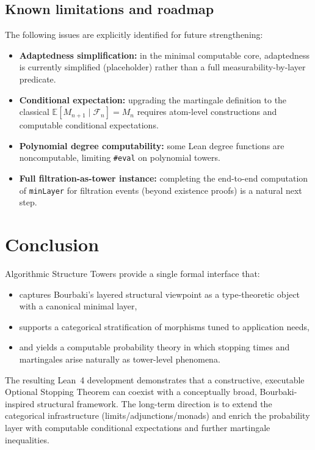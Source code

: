 \documentclass[11pt]{article}
\newcommand{\EE}{\mathbb{E}}
\begin{document}
\subsection{Known limitations and roadmap}
The following issues are explicitly identified for future strengthening:
\begin{itemize}[leftmargin=1.2em]
\item \textbf{Adaptedness simplification:} in the minimal computable core, adaptedness is currently simplified (placeholder) rather than a full measurability-by-layer predicate.
\item \textbf{Conditional expectation:} upgrading the martingale definition to the classical $\EE[M_{n+1}\mid \mathcal{F}_n]=M_n$ requires atom-level constructions and computable conditional expectations.
\item \textbf{Polynomial degree computability:} some Lean degree functions are noncomputable, limiting \texttt{\#eval} on polynomial towers.
\item \textbf{Full filtration-as-tower instance:} completing the end-to-end computation of \texttt{minLayer} for filtration events (beyond existence proofs) is a natural next step.
\end{itemize}

\section{Conclusion}
Algorithmic Structure Towers provide a single formal interface that:
\begin{itemize}[leftmargin=1.2em]
\item captures Bourbaki's layered structural viewpoint as a type-theoretic object with a canonical minimal layer,
\item supports a categorical stratification of morphisms tuned to application needs,
\item and yields a computable probability theory in which stopping times and martingales arise naturally as tower-level phenomena.
\end{itemize}

The resulting Lean~4 development demonstrates that a constructive, executable Optional Stopping Theorem can coexist with a conceptually broad, Bourbaki-inspired structural framework. The long-term direction is to extend the categorical infrastructure (limits/adjunctions/monads) and enrich the probability layer with computable conditional expectations and further martingale inequalities.
\end{document}
